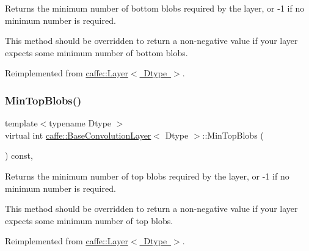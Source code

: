 Returns the minimum number of bottom blobs required by the layer, or -\/1 if no minimum number is required. 

This method should be overridden to return a non-\/negative value if your layer expects some minimum number of bottom blobs. 

Reimplemented from \mbox{\hyperlink{classcaffe_1_1_layer_aca3cb2bafaefda5d4760aaebd0b72def}{caffe\+::\+Layer$<$ Dtype $>$}}.

\mbox{\label{classcaffe_1_1_base_convolution_layer_ae4092cf1b48e18e5d82cd714ae6e8547}} 
\subsubsection{\texorpdfstring{Min\+Top\+Blobs()}{MinTopBlobs()}\hspace{0.1cm}{\footnotesize\ttfamily [1/2]}}
{\footnotesize\ttfamily template$<$typename Dtype $>$ \\
virtual int \mbox{\hyperlink{classcaffe_1_1_base_convolution_layer}{caffe\+::\+Base\+Convolution\+Layer}}$<$ Dtype $>$\+::Min\+Top\+Blobs (\begin{DoxyParamCaption}{ }\end{DoxyParamCaption}) const\hspace{0.3cm}{\ttfamily [inline]}, {\ttfamily [virtual]}}



Returns the minimum number of top blobs required by the layer, or -\/1 if no minimum number is required. 

This method should be overridden to return a non-\/negative value if your layer expects some minimum number of top blobs. 

Reimplemented from \mbox{\hyperlink{classcaffe_1_1_layer_ab9e4c8d642e413948b131d851a8462a4}{caffe\+::\+Layer$<$ Dtype $>$}}.

\mbox{\label{classcaffe_1_1_base_convolution_layer_ae4092cf1b48e18e5d82cd714ae6e8547}} 
